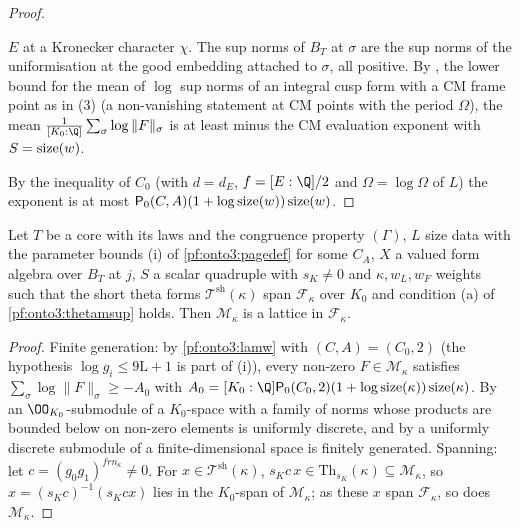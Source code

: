 \begin{proof}
\begin{enumerate}[label=(\arabic*)]
$E$ at a Kronecker character $\chi$. The sup norms of $B_T$ at $\sigma$ are the sup norms of the uniformisation at the
good embedding attached to $\sigma$, all positive. By
, the lower bound for the mean of $\log$ sup
norms of an integral cusp form with a CM frame point as in (3) (a non-vanishing statement at CM points with the
period $\Omega$), the mean $\frac1{[K_0:\Q]}\sum_\sigma\log\|F\|_\sigma$ is at least minus the CM evaluation exponent with
$S=\operatorname{size}(w)$.
\end{enumerate}
By the inequality of $C_0$ (with $d=d_E$, $f=[E:\Q]/2$ and $\Omega=\log\Omega$ of $L$) the exponent is at most
$\mathsf{P}_0(C,A)(1+\log\operatorname{size}(w))\operatorname{size}(w)$.
\end{proof}

\begin{lemma}\label{pf:onto3:latat}
Let $T$ be a core with its laws and the congruence property $(\Gamma)$, $L$ size data with the parameter bounds (i) of
\cref{pf:onto3:pagedef} for some $C_A$, $X$ a valued form algebra over $B_T$ at $j$, $S$ a scalar quadruple with $s_K\ne0$
and $\kappa,w_L,w_F$ weights such that the short theta forms $\mathcal T^{\mathrm{sh}}(\kappa)$ span $\mathcal F_\kappa$ over
$K_0$ and condition (a) of \cref{pf:onto3:thetamsup} holds. Then $\mathcal M_\kappa$ is a lattice in $\mathcal F_\kappa$.
\end{lemma}

\begin{proof}
Finite generation: by \cref{pf:onto3:lamw} with $(C,A)=(C_0,2)$ (the hypothesis $\log g_i\le9\mathrm L+1$ is part of (i)),
every non-zero $F\in\mathcal M_\kappa$ satisfies $\sum_\sigma\log\|F\|_\sigma\ge-A_0$ with $A_0=[K_0:\Q]\ontothreePP_0(C_0,2)
(1+\log\ontothreesize(\kappa))\ontothreesize(\kappa)$. By  an $\OO_{K_0}$-submodule of a
$K_0$-space with a family of norms whose products are bounded below on non-zero elements is uniformly discrete, and by
 a uniformly discrete submodule of a finite-dimensional space is finitely
generated. Spanning: let $c=(g_0g_1)^{frn_\kappa}\ne0$. For $x\in\mathcal T^{\mathrm{sh}}(\kappa)$, $s_Kc\,x\in\mathrm{Th}_{s_K}
(\kappa)\subseteq\mathcal M_\kappa$, so $x=(s_Kc)^{-1}(s_Kcx)$ lies in the $K_0$-span of $\mathcal M_\kappa$; as these $x$ span
$\mathcal F_\kappa$, so does $\mathcal M_\kappa$.
\end{proof}



